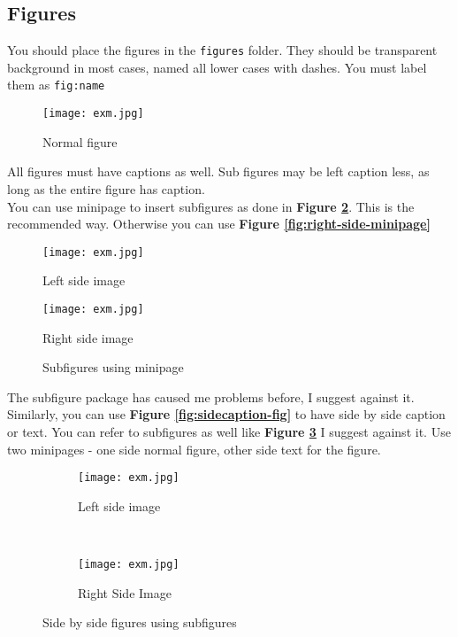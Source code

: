\subsection{Figures}

You should place the figures in the \texttt{figures} folder. They should be transparent background in most cases, named all lower cases with dashes. You must label them as \texttt{fig:name}\\

\begin{figure}[!hbt]
  	\centering
 	\texttt{[image: exm.jpg]}
  	\caption{Normal figure}
 	\label{fig:normal-figure}
\end{figure}

All figures must have captions as well. Sub figures may be left caption less, as long as the entire figure has caption.\\

You can use minipage to insert subfigures as done in \textbf{Figure \ref{fig:subfig-minipage}}. This is the recommended way. Otherwise you can use \textbf{Figure \ref{fig:right-side-minipage}}\\

\begin{figure}[!htb]
    \centering
    \begin{minipage}{.5\textwidth}
        \centering
        \texttt{[image: exm.jpg]}
        \caption{Left side image}
        \label{fig:left side minipage}
    \end{minipage}%
    \begin{minipage}{0.5\textwidth}
        \centering
        \texttt{[image: exm.jpg]}
        \caption{Right side image}
        \label{fig:right-side-minipage}
    \end{minipage}
    \caption{Subfigures using minipage}
    \label{fig:subfig-minipage}
\end{figure}

The subfigure package has caused me problems before, I suggest against it. Similarly, you can use \textbf{Figure \ref{fig:sidecaption-fig}} to have side by side caption or text. You can refer to subfigures as well like \textbf{Figure \ref{fig:left-side-image}} I suggest against it. Use two minipages - one side normal figure, other side text for the figure.

\begin{figure}[!hbt]
    \centering
    \begin{subfigure}[b]{0.4\textwidth}
        \texttt{[image: exm.jpg]}
        \caption{Left side image}
        \label{fig:left-side-image}
    \end{subfigure}
    ~ %
    \begin{subfigure}[b]{0.4\textwidth}
        \texttt{[image: exm.jpg]}
        \caption{Right Side Image}
        \label{fig:right-side-image}
    \end{subfigure}
    \caption{Side by side figures using subfigures}
    \label{fig:subfigure}
\end{figure}

